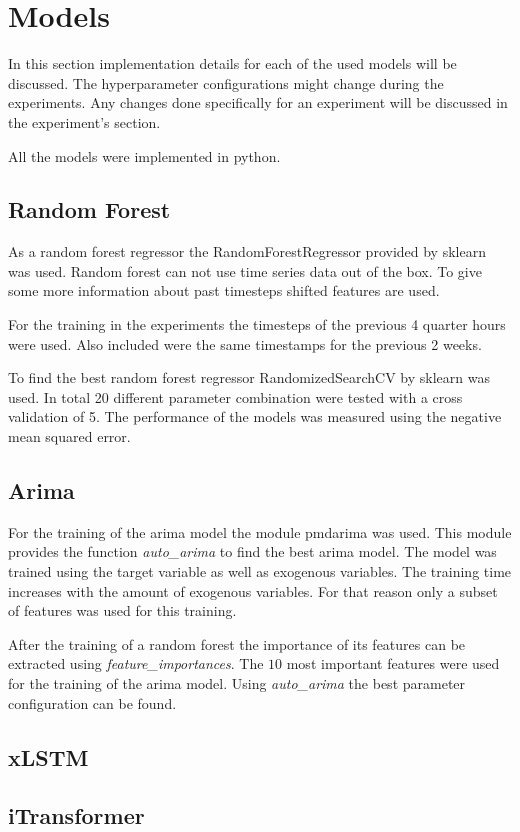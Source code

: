 \documentclass[class=scrbook, crop=false]{standalone}
\begin{document}
\section{Models}
\label{Section::Models}

In this section implementation details for each of the used models will be discussed. 
The hyperparameter configurations might change during the experiments. 
Any changes done specifically for an experiment will be discussed in the experiment's section.

All the models were implemented in python. 

\subsection{Random Forest}
\label{Section::Random_Forest}

As a random forest regressor the RandomForestRegressor provided by sklearn was used.
Random forest can not use time series data out of the box.
To give some more information about past timesteps shifted features are used.

For the training in the experiments the timesteps of the previous 4 quarter hours were used.
Also included were the same timestamps for the previous 2 weeks.

To find the best random forest regressor RandomizedSearchCV by sklearn was used.
In total 20 different parameter combination were tested with a cross validation of 5.
The performance of the models was measured using the negative mean squared error.

\subsection{Arima}
\label{Section::Arima}

For the training of the arima model the module pmdarima was used.
This module provides the function \textit{auto\_arima} to find the best arima model.
The model was trained using the target variable as well as exogenous variables.
The training time increases with the amount of exogenous variables.
For that reason only a subset of features was used for this training.

After the training of a random forest the importance of its features can be extracted using \textit{feature\_importances}. 
The $10$ most important features were used for the training of the arima model.
Using \textit{auto\_arima} the best parameter configuration can be found.

\subsection{xLSTM}
\label{Section::xLSTM}

\subsection{iTransformer}
\label{Section::iTransformer}
\end{document}
